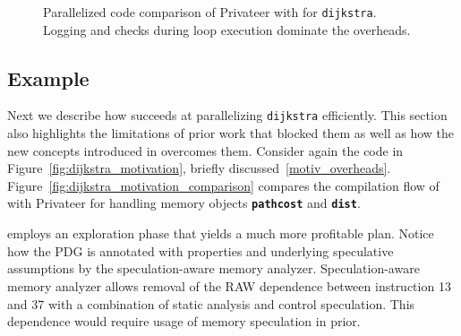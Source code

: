\begin{figure}[!h]
\centering
\scriptsize
{}
\caption{Parallelized code comparison of Privateer with \name for
\texttt{dijkstra}. Logging and checks during loop execution dominate the
overheads.}
\label{fig:dijkstra_motivation_comparison_source_code}
\end{figure}


\subsection{Example}
\label{motiv_example}

Next we describe how \name succeeds at parallelizing
\texttt{dijkstra} efficiently. This section also highlights the limitations
of prior work that blocked them as well as how the new concepts introduced
in \name overcomes them.
%
Consider again the code in Figure~\ref{fig:dijkstra_motivation},
briefly discussed~\ref{motiv_overheads}.
%
Figure~\ref{fig:dijkstra_motivation_comparison} compares the
compilation flow of \name with Privateer for handling memory objects
\texttt{\textbf{pathcost}} and \texttt{\textbf{dist}}.

\name employs an exploration phase that yields a much more profitable plan.
Notice how the PDG is annotated with properties and underlying speculative
assumptions by the speculation-aware memory analyzer. Speculation-aware
memory analyzer allows removal of the RAW dependence between instruction 13
and 37 with a combination of static analysis and control speculation. This
dependence would require usage of memory speculation in prior.
%

